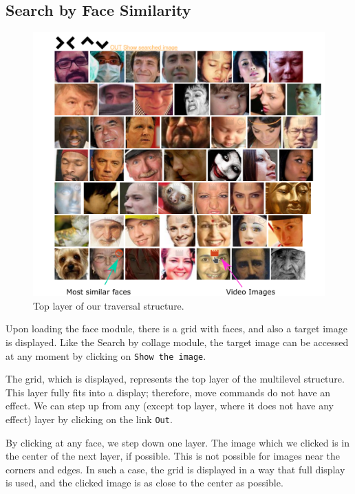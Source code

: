 \subsection{Search by Face Similarity}

\begin{figure}
    \centering
    \includegraphics[width=\linewidth]{img/face_grid.png}
    \caption{Top layer of our traversal structure.}
    \label{fig:face_grid_app}
\end{figure}

Upon loading the face module, there is a grid with faces, and also a target image is displayed. Like the Search by collage module, the target image can be accessed at any moment by clicking on \verb+Show the image+. 

The grid, which is displayed, represents the top layer of the multilevel structure. This layer fully fits into a display; therefore, move commands do not have an effect. We can step up from any (except top layer, where it does not have any effect) layer by clicking on the link \verb+Out+.

By clicking at any face, we step down one layer. The image which we clicked is in the center of the next layer, if possible. This is not possible for images near the corners and edges. In such a case, the grid is displayed in a way that full display is used, and the clicked image is as close to the center as possible.

